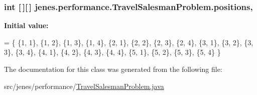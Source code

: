 \hypertarget{classjenes_1_1performance_1_1_travel_salesman_problem_a7d151f0a4b1d25c340338cb946310111}{
\subsubsection[{positions}]{\setlength{\rightskip}{0pt plus 5cm}int \mbox{[}$\,$\mbox{]}\mbox{[}$\,$\mbox{]} jenes.\-performance.\-Travel\-Salesman\-Problem.\-positions\hspace{0.3cm}{\ttfamily [static]}, {\ttfamily [private]}}}\label{classjenes_1_1performance_1_1_travel_salesman_problem_a7d151f0a4b1d25c340338cb946310111}
{\bfseries Initial value\-:}
\begin{DoxyCode}
= \{
        \{1, 1\}, \{1, 2\}, \{1, 3\}, \{1, 4\}, \{2, 1\}, \{2, 2\}, \{2, 3\}, \{2, 4\}, \{3, 1\}, \{3, 2\}, \{3, 3\},
        \{3, 4\}, \{4, 1\}, \{4, 2\}, \{4, 3\}, \{4, 4\}, \{5, 1\}, \{5, 2\}, \{5, 3\}, \{5, 4\}
    \}
\end{DoxyCode}


The documentation for this class was generated from the following file\-:\begin{DoxyCompactItemize}
\item 
src/jenes/performance/\hyperlink{performance_2_travel_salesman_problem_8java}{Travel\-Salesman\-Problem.\-java}\end{DoxyCompactItemize}

